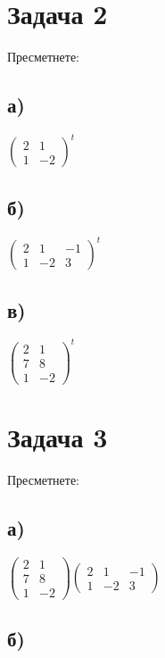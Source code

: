 \documentclass[12pt]{article}
\begin{document}
\section*{Задача 2}
    
Пресметнете:

\subsection*{а)}

$\begin{pmatrix}
    2 & 1 \\
    1 & -2
\end{pmatrix}^t$

\subsection*{б)}

$\begin{pmatrix}
    2 & 1 & -1 \\
    1 & -2 & 3
\end{pmatrix}^t$

\subsection*{в)}

$\begin{pmatrix}
    2 & 1 \\
    7 & 8 \\
    1 & -2
\end{pmatrix}^t$

\section*{Задача 3}

Пресметнете:

\subsection*{а)}

$\begin{pmatrix}
    2 & 1 \\
    7 & 8 \\
    1 & -2
\end{pmatrix} \begin{pmatrix}
    2 & 1 & -1 \\
    1 & -2 & 3
\end{pmatrix}$

\subsection*{б)}
\end{document}
